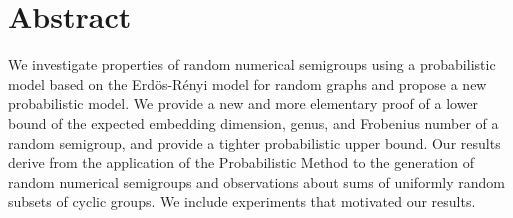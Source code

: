 \chapter*{Abstract}

We investigate properties of random numerical semigroups using a probabilistic model based on the Erdös-Rényi model for random graphs and propose a new probabilistic model. We provide a new and more elementary proof of a lower bound of the expected embedding dimension, genus, and Frobenius number of a random semigroup, and provide a tighter probabilistic upper bound. Our results derive from the application of the Probabilistic Method to the generation of random numerical semigroups and observations about sums of uniformly random subsets of cyclic groups. We include experiments that motivated our results.